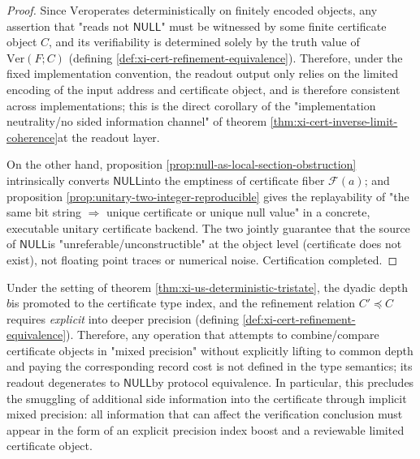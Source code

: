 \begin{proof}
Since \(\mathrm{Ver}\) ​​operates deterministically on finitely encoded objects, any assertion that "reads not \(\mathsf{NULL}\)" must be witnessed by some finite certificate object \(C\), and its verifiability is determined solely by the truth value of \(\mathrm{Ver}(F;C)\) (defining \ref{def:xi-cert-refinement-equivalence}).
Therefore, under the fixed implementation convention, the readout output only relies on the limited encoding of the input address and certificate object, and is therefore consistent across implementations; this is the direct corollary of the "implementation neutrality/no sided information channel" of theorem \ref{thm:xi-cert-inverse-limit-coherence} ​​at the readout layer.
\par
On the other hand, proposition \ref{prop:null-as-local-section-obstruction} intrinsically converts \(\mathsf{NULL}\) ​​into the emptiness of certificate fiber \(\mathscr F(a)\); and proposition \ref{prop:unitary-two-integer-reproducible} gives the replayability of "the same bit string \(\Rightarrow\) unique certificate or unique null value" in a concrete, executable unitary certificate backend.
The two jointly guarantee that the source of \(\mathsf{NULL}\) ​​is "unreferable/unconstructible" at the object level (certificate does not exist), not floating point traces or numerical noise. Certification completed.
\end{proof}

\begin{corollary}\label{cor:xi-precision-type-no-leakage}
Under the setting of theorem \ref{thm:xi-us-deterministic-tristate}, the dyadic depth \(b\) ​​is promoted to the certificate type index, and the refinement relation \(C'\preceq C\) requires \emph{explicit} into deeper precision (defining \ref{def:xi-cert-refinement-equivalence}).
Therefore, any operation that attempts to combine/compare certificate objects in "mixed precision" without explicitly lifting to common depth and paying the corresponding record cost is not defined in the type semantics; its readout degenerates to \(\mathsf{NULL}\) ​​by protocol equivalence.
In particular, this precludes the smuggling of additional side information into the certificate through implicit mixed precision: all information that can affect the verification conclusion must appear in the form of an explicit precision index boost and a reviewable limited certificate object.
\end{corollary}

